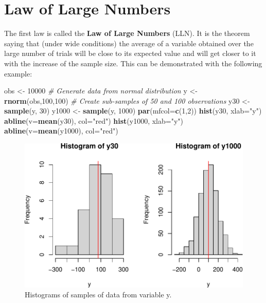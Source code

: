\documentclass[
]{book}
\newenvironment{Shaded}{\begin{snugshade}}{\end{snugshade}}
\newcommand{\AttributeTok}[1]{\textcolor[rgb]{0.13,0.29,0.53}{#1}}
\newcommand{\CommentTok}[1]{\textcolor[rgb]{0.56,0.35,0.01}{\textit{#1}}}
\newcommand{\DecValTok}[1]{\textcolor[rgb]{0.00,0.00,0.81}{#1}}
\newcommand{\FunctionTok}[1]{\textcolor[rgb]{0.13,0.29,0.53}{\textbf{#1}}}
\newcommand{\NormalTok}[1]{#1}
\newcommand{\OtherTok}[1]{\textcolor[rgb]{0.56,0.35,0.01}{#1}}
\newcommand{\StringTok}[1]{\textcolor[rgb]{0.31,0.60,0.02}{#1}}
\theoremstyle{definition}
\theoremstyle{definition}
\theoremstyle{definition}
\theoremstyle{definition}
\theoremstyle{remark}
\begin{document}
\section{Law of Large Numbers}\label{LLN}

The first law is called the \textbf{Law of Large Numbers} (LLN). It is the theorem saying that (under wide conditions) the average of a variable obtained over the large number of trials will be close to its expected value and will get closer to it with the increase of the sample size. This can be demonstrated with the following example:

\begin{Shaded}
\begin{Highlighting}[]
\NormalTok{obs }\OtherTok{\textless{}{-}} \DecValTok{10000}
\CommentTok{\# Generate data from normal distribution}
\NormalTok{y }\OtherTok{\textless{}{-}} \FunctionTok{rnorm}\NormalTok{(obs,}\DecValTok{100}\NormalTok{,}\DecValTok{100}\NormalTok{)}
\CommentTok{\# Create sub{-}samples of 50 and 100 observations}
\NormalTok{y30 }\OtherTok{\textless{}{-}} \FunctionTok{sample}\NormalTok{(y, }\DecValTok{30}\NormalTok{)}
\NormalTok{y1000 }\OtherTok{\textless{}{-}} \FunctionTok{sample}\NormalTok{(y, }\DecValTok{1000}\NormalTok{)}
\FunctionTok{par}\NormalTok{(}\AttributeTok{mfcol=}\FunctionTok{c}\NormalTok{(}\DecValTok{1}\NormalTok{,}\DecValTok{2}\NormalTok{))}
\FunctionTok{hist}\NormalTok{(y30, }\AttributeTok{xlab=}\StringTok{"y"}\NormalTok{)}
\FunctionTok{abline}\NormalTok{(}\AttributeTok{v=}\FunctionTok{mean}\NormalTok{(y30), }\AttributeTok{col=}\StringTok{"red"}\NormalTok{)}
\FunctionTok{hist}\NormalTok{(y1000, }\AttributeTok{xlab=}\StringTok{"y"}\NormalTok{)}
\FunctionTok{abline}\NormalTok{(}\AttributeTok{v=}\FunctionTok{mean}\NormalTok{(y1000), }\AttributeTok{col=}\StringTok{"red"}\NormalTok{)}
\end{Highlighting}
\end{Shaded}

\begin{figure}
\centering
\includegraphics{Svetunkov---Statistics-for-Business-Analytics_files/figure-latex/histY30Y1000-1.pdf}
\caption{\label{fig:histY30Y1000}Histograms of samples of data from variable y.}
\end{figure}
\end{document}
